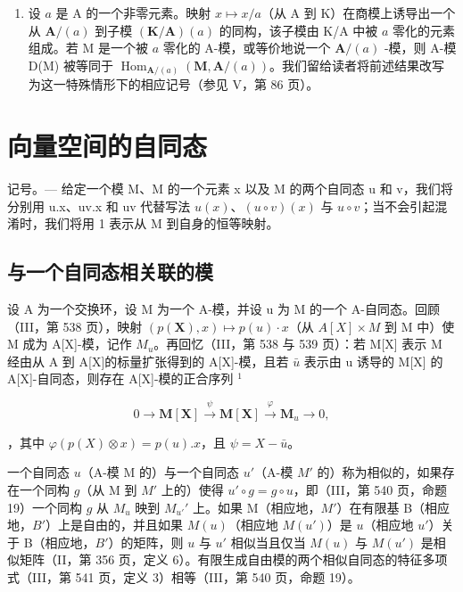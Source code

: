\begin{enumerate}
\def\labelenumi{\arabic{enumi})}
\setcounter{enumi}{1}
\tightlist
\item
  设 \(a\) 是 A 的一个非零元素。映射 \(x \mapsto x/a\)（从 A 到 K）在商模上诱导出一个从 \(\mathbf{A}/(a)\) 到子模 \((\mathbf{K}/\mathbf{A})(a)\) 的同构，该子模由 K/A 中被 \(a\) 零化的元素组成。若 M 是一个被 \(a\) 零化的 A-模，或等价地说一个 \(\mathbf{A}/(a)\) -模，则 A-模 D(M) 被等同于 \(\operatorname{Hom}_{\mathbf{A}/(a)}(\mathbf{M}, \mathbf{A}/(a))\)。我们留给读者将前述结果改写为这一特殊情形下的相应记号（参见 V，第 86 页）。
\end{enumerate}

\section{向量空间的自同态}

记号。--- 给定一个模 M、M 的一个元素 x 以及 M 的两个自同态 u 和 v，我们将分别用 u.x、uv.x 和 uv 代替写法 \(u(x)\)、\((u \circ v)(x)\) 与 \(u \circ v\)；当不会引起混淆时，我们将用 1 表示从 M 到自身的恒等映射。

\subsection{与一个自同态相关联的模}

设 A 为一个交换环，设 M 为一个 A-模，并设 u 为 M 的一个 A-自同态。回顾（III，第 538 页），映射 \((p(\mathbf{X}), x) \mapsto p(u) \cdot x\)（从 \(A[X] \times M\) 到 M 中）使 M 成为 A{[}X{]}-模，记作 \(M_{u}\)。再回忆（III，第 538 与 539 页）：若 M{[}X{]} 表示 M 经由从 A 到 A{[}X{]}的标量扩张得到的 A{[}X{]}-模，且若 \(\bar{u}\) 表示由 u 诱导的 M{[}X{]} 的 A{[}X{]}-自同态，则存在 A{[}X{]}-模的正合序列 \(^{1}\)

\[
0 \to \mathbf {M} [ \mathbf {X} ] \stackrel {\psi} {\to} \mathbf {M} [ \mathbf {X} ] \stackrel {\varphi} {\to} \mathbf {M} _ {u} \to 0,\tag{1}
\]

，其中 \(\varphi(p(X) \otimes x) = p(u).x\)，且 \(\psi = X - \bar{u}\)。

一个自同态 \(u\)（A-模 M 的）与一个自同态 \(u'\)（A-模 \(M'\) 的）称为相似的，如果存在一个同构 \(g\)（从 M 到 \(M'\) 上的）使得 \(u' \circ g = g \circ u\)，即（III，第 540 页，命题 19）一个同构 \(g\) 从 \(M_u\) 映到 \(M_{u'}'\) 上。如果 M（相应地，\(M'\)）在有限基 B（相应地，\(B'\)）上是自由的，并且如果 \(M(u)\)（相应地 \(M(u')\)）是 \(u\)（相应地 \(u'\)）关于 B（相应地，\(B'\)）的矩阵，则 \(u\) 与 \(u'\) 相似当且仅当 \(M(u)\) 与 \(M(u')\) 是相似矩阵（II，第 356 页，定义 6）。有限生成自由模的两个相似自同态的特征多项式（III，第 541 页，定义 3）相等（III，第 540 页，命题 19）。

